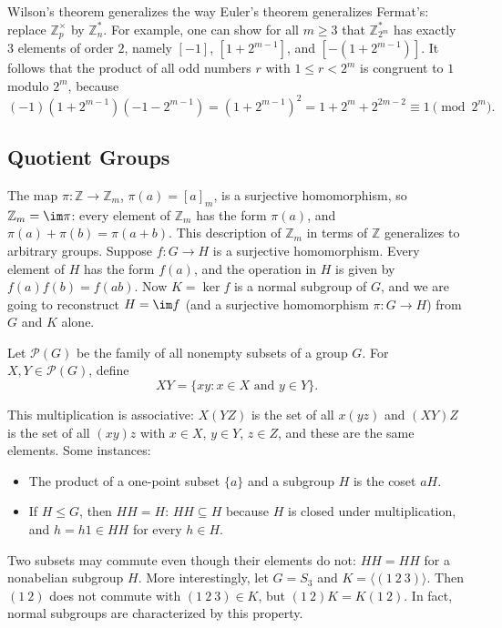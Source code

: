 \begin{remark}
	Wilson's theorem generalizes the way Euler's theorem generalizes Fermat's: replace
	\(\mathbb Z_p^\times\) by \(\mathbb Z_n^*\). For example, one can show for all
	\(m \geq 3\) that \(\mathbb Z_{2^m}^*\) has exactly \(3\) elements of order \(2\), namely
	\([-1]\), \([1 + 2^{m-1}]\), and \([-(1 + 2^{m-1})]\). It follows that the product of
	all odd numbers \(r\) with \(1 \leq r < 2^m\) is congruent to \(1\) modulo \(2^m\), because
	\[
		(-1)(1 + 2^{m-1})(-1 - 2^{m-1}) = (1 + 2^{m-1})^2 = 1 + 2^m + 2^{2m-2}
		\equiv 1 \pmod{2^m}.
	\]
\end{remark}

\subsection{Quotient Groups}

The map \(\pi\colon \mathbb Z \to \mathbb Z_m\), \(\pi(a) = [a]_m\), is a surjective
homomorphism, so \(\mathbb Z_m = \im\pi\): every element of \(\mathbb Z_m\) has the form
\(\pi(a)\), and \(\pi(a) + \pi(b) = \pi(a+b)\). This description of \(\mathbb Z_m\) in
terms of \(\mathbb Z\) generalizes to arbitrary groups. Suppose \(f\colon G \to H\) is a
surjective homomorphism. Every element of \(H\) has the form \(f(a)\), and the operation
in \(H\) is given by \(f(a)f(b) = f(ab)\). Now \(K = \ker f\) is a normal subgroup of \(G\),
and we are going to reconstruct \(H = \im f\) (and a surjective homomorphism
\(\pi\colon G \to H\)) from \(G\) and \(K\) alone.

\begin{definition}
	Let \(\mathcal P(G)\) be the family of all nonempty subsets of a group \(G\). For
	\(X, Y \in \mathcal P(G)\), define
	\[
		XY = \{xy : x \in X \text{ and } y \in Y\}.
	\]
\end{definition}

This multiplication is associative: \(X(YZ)\) is the set of all \(x(yz)\) and \((XY)Z\) is
the set of all \((xy)z\) with \(x \in X\), \(y \in Y\), \(z \in Z\), and these are the same
elements. Some instances:
\begin{itemize}
	\item The product of a one-point subset \(\{a\}\) and a subgroup \(H\) is the coset
	      \(aH\).
	\item If \(H \leq G\), then \(HH = H\): \(HH \subseteq H\) because \(H\) is closed under
	      multiplication, and \(h = h1 \in HH\) for every \(h \in H\).
\end{itemize}
Two subsets may commute even though their elements do not: \(HH = HH\) for a nonabelian
subgroup \(H\). More interestingly, let \(G = S_3\) and \(K = \langle(1\ 2\ 3)\rangle\).
Then \((1\ 2)\) does not commute with \((1\ 2\ 3) \in K\), but \((1\ 2)K = K(1\ 2)\). In
fact, normal subgroups are characterized by this property.

